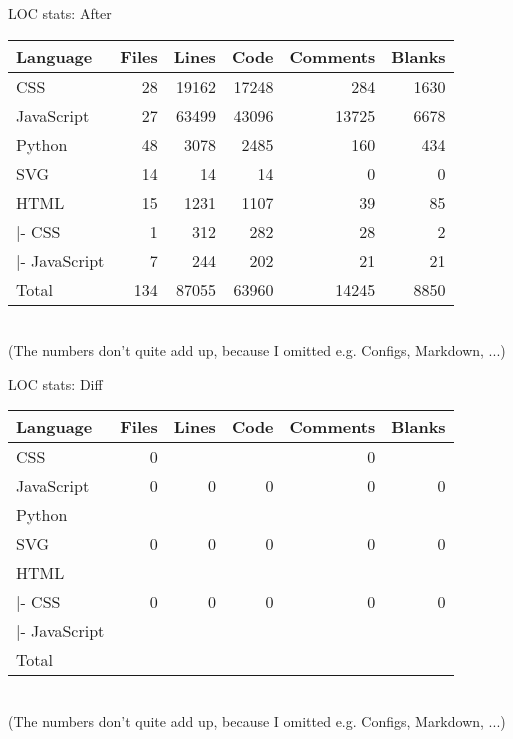 \begin{frame}[c,fragile]{LOC stats: After}
    \large
    \begin{tabular}{l:r:r:r:r:r}
        Language & Files & Lines & Code & Comments & Blanks \\ \hline
        CSS            &       28   &    19162    &   17248   &      284    &    1630 \\
        JavaScript     &       27   &    63499    &   43096   &    13725    &    6678 \\ \hdashline
        Python         &       48   &     3078    &    2485   &      160    &     434 \\
        SVG            &       14   &       14    &      14   &        0    &       0 \\ \hdashline
        HTML           &       15   &     1231    &    1107   &       39    &      85 \\
        |- CSS         &        1   &      312    &     282   &       28    &       2 \\
        |- JavaScript  &        7   &      244    &     202   &       21    &      21 \\ \hdashline
        Total          &      134   &    87055    &   63960   &    14245    &    8850 \\
    \end{tabular} \\
    \scriptsize \newline (The numbers don't quite add up, because I omitted e.g. Configs, Markdown, ...)
\end{frame}


\begin{frame}[c,fragile]{LOC stats: Diff}
    \large
    \begin{tabular}{l:r:r:r:r:r}
        Language & Files & Lines & Code & Comments & Blanks \\ \hline
        CSS            &        0   &       &     &        0    &     \\
        JavaScript     &        0   &        0    &       0   &        0    &       0  \\ \hdashline
        Python         &      &     &    &      &   \\
        SVG            &        0   &        0    &       0   &        0    &       0  \\ \hdashline
        HTML           &       &      &    &        &    \\
        |- CSS         &        0   &        0    &       0   &        0    &       0  \\
        |- JavaScript  &       &       &     &        &     \\ \hdashline
        Total          &      &     &   &      &   \\
    \end{tabular} \\
    \scriptsize \newline (The numbers don't quite add up, because I omitted e.g. Configs, Markdown, ...)
\end{frame}
